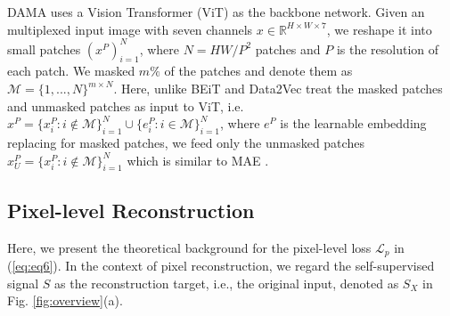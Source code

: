 \documentclass[10pt,twocolumn,letterpaper]{article}
\begin{document}
DAMA uses a Vision Transformer (ViT) \cite{vit} as the backbone network. Given an multiplexed input image with seven channels $x\in \mathbb{R}^{H\times W\times7}$, we reshape it into small patches ${(x^P)}^{N}_{i=1}$, where $N = HW/P^2$ patches and $P$ is the resolution of each patch. We masked $m\%$ of the patches and denote them as $\mathcal M = \{1,..., N\}^{m\times N}$. Here, unlike BEiT \cite{beit} and Data2Vec \cite{data2vec} treat the masked patches and unmasked patches as input to ViT, i.e. $x^P = \{x^P_i: i \notin \mathcal M\}_{i=1}^{N} \cup \{e^P_i: i \in \mathcal M\}_{i=1}^{N}$, where $e^P$ is the learnable embedding replacing for masked patches, we feed only the unmasked patches $x^P_U = \{x^P_i: i \notin \mathcal M\}_{i=1}^{N}$ which is similar to MAE \cite{mae}.

\subsection{Pixel-level Reconstruction}\label{subsec:pixel}
Here, we present the theoretical background for the pixel-level loss $\mathcal L_p$ in (\ref{eq:eq6}). In the context of pixel reconstruction, we regard the self-supervised signal $S$ as the reconstruction target, i.e., the original input, denoted as $S_X$ in Fig. \ref{fig:overview}(a).
\end{document}
